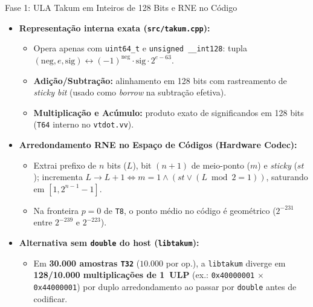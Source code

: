 \documentclass[aspectratio=169,10pt]{beamer}
\begin{document}
\begin{frame}{Fase 1: ULA Takum em Inteiros de 128 Bits e RNE no Código}
	\small
	\begin{itemize}
		\item \textbf{Representação interna exata (\texttt{src/takum.cpp}):}
		      \begin{itemize}
		          \item Opera apenas com \texttt{uint64\_t} e \texttt{unsigned \_\_int128}: tupla $(\mathrm{neg}, e, \mathrm{sig}) \leftrightarrow (-1)^{\mathrm{neg}}\cdot\mathrm{sig}\cdot 2^{e-63}$.
		          \item \textbf{Adição/Subtração:} alinhamento em 128 bits com rastreamento de \emph{sticky bit} (usado como \emph{borrow} na subtração efetiva).
		          \item \textbf{Multiplicação e Acúmulo:} produto exato de significandos em 128 bits (\texttt{T64} interno no \texttt{vtdot.vv}).
		      \end{itemize}
		\item \textbf{Arredondamento RNE no Espaço de Códigos (Hardware Codec):}
		      \begin{itemize}
		          \item Extrai prefixo de $n$ bits ($L$), bit $(n+1)$ de meio-ponto ($m$) e \emph{sticky} ($st$); incrementa $L \to L+1 \iff m=1 \land (st \lor (L\bmod 2 = 1))$, saturando em $[1, 2^{n-1}-1]$.
		          \item Na fronteira $p=0$ de \texttt{T8}, o ponto médio no código é geométrico ($2^{-231}$ entre $2^{-239}$ e $2^{-223}$).
		      \end{itemize}
		\item \textbf{Alternativa sem \texttt{double} do host (\texttt{libtakum}):}
		      \begin{itemize}
		          \item Em \textbf{30.000 amostras \texttt{T32}} ($10.000$ por op.), a \texttt{libtakum} diverge em \textbf{128/10.000 multiplicações de 1~ULP} (ex.: \texttt{0x40000001} $\times$ \texttt{0x44000001}) por duplo arredondamento ao passar por \texttt{double} antes de codificar.
		      \end{itemize}
	\end{itemize}
\end{frame}
\end{document}
